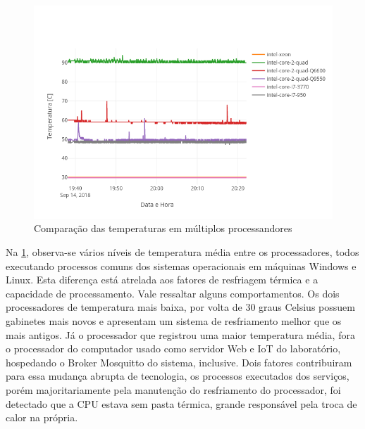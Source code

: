 \begin{figure}[h!]
\centering
\includegraphics[width=16cm]{./02_Capitulos/02_Cap4/figures/temp-devices-5}
\caption{Comparação das temperaturas em múltiplos processandores}
\label{fig:temp-devices-5}
\end{figure}

Na \ref{fig:temp-devices-5}, observa-se vários níveis de temperatura média entre os processadores, todos executando processos comuns dos sistemas operacionais em máquinas Windows e Linux. Esta diferença está atrelada aos fatores de resfriagem térmica e a capacidade de processamento. Vale ressaltar alguns comportamentos. Os dois processadores de temperatura mais baixa, por volta de 30 graus Celsius possuem gabinetes mais novos e apresentam um sistema de resfriamento melhor que os mais antigos. Já o processador que registrou uma maior temperatura média, fora o processador do computador usado como servidor Web e IoT do laboratório, hospedando o Broker Mosquitto do sistema, inclusive. Dois fatores contribuiram para essa mudança abrupta de tecnologia, os processos executados dos serviços, porém majoritariamente pela manutenção do resfriamento do processador, foi detectado que a CPU estava sem pasta térmica, grande responsável pela troca de calor na própria.


